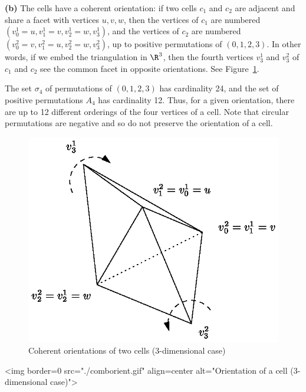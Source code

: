 {\bf (b)} The cells have a coherent orientation: if two cells $c_1$
and $c_2$ are adjacent and share a facet with vertices $u,v,w$, then
the vertices of $c_1$ are numbered $(v_0^1 = u, v_1^1 = v, v_2^1 = w,
v_3^1)$, and the vertices of $c_2$ are numbered $(v_0^2 = v, v_1^2 = u,
v_2^2 = w, v_3^2)$, up to positive permutations of $(0,1,2,3)$. In
other words, if we embed the triangulation in $\R^3$, then the fourth
vertices $v_3^1$ and $v_3^2$ of $c_1$ and $c_2$ see the common facet
in opposite orientations. See Figure~\ref{TDS3-fig-comborient}.

The set {\Large $\sigma$}$_4$ of permutations of
$(0,1,2,3)$ has cardinality 24, and the set of positive permutations
$A_4$ has cardinality 12. Thus, for a given orientation, there
are up to 12 different orderings of the four vertices of a cell. Note
that circular permutations are negative and so do not preserve the
orientation of a cell.

\begin{ccTexOnly}
\begin{figure}[htbp]

\begin{center} 
\includegraphics{comborient.eps} 
\end{center}
\caption{Coherent orientations of two cells (3-dimensional case)
\label{TDS3-fig-comborient}} 
\end{figure} 
\end{ccTexOnly}

\begin{ccHtmlOnly}
<img border=0 src="./comborient.gif" align=center alt="Orientation of a cell (3-dimensional case)">
\end{ccHtmlOnly}

